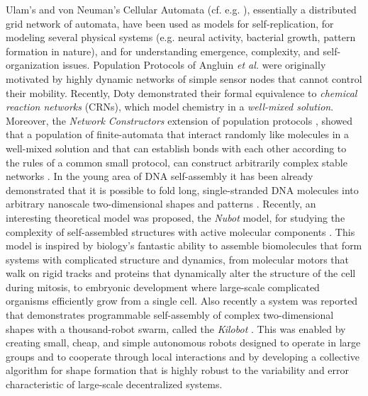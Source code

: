 \documentclass[oribibl, 11pt]{llncs}
\begin{document}
Ulam's and von Neuman's Cellular Automata (cf. e.g. \cite{Sc11}), essentially a distributed grid network of automata, have been used as models for self-replication, for modeling several physical systems (e.g. neural activity, bacterial growth, pattern formation in nature), and for understanding emergence, complexity, and self-organization issues. Population Protocols of Angluin \emph{et al.} \cite{AADFP06} were originally motivated by highly dynamic networks of simple sensor nodes that cannot control their mobility. Recently, Doty \cite{Do14} demonstrated their formal equivalence to \emph{chemical reaction networks} (CRNs), which model chemistry in a \emph{well-mixed solution}. Moreover, the \emph{Network Constructors} extension of population protocols \cite{MS14}, showed that a population of finite-automata that interact randomly like molecules in a well-mixed solution and that can establish bonds with each other according to the rules of a common small protocol, can construct arbitrarily complex stable networks \cite{MS14}. In the young area of DNA self-assembly it has been already demonstrated that it is possible to fold long, single-stranded DNA molecules into arbitrary nanoscale two-dimensional shapes and patterns \cite{Ro06}. Recently, an interesting theoretical model was proposed, the \emph{Nubot} model, for studying the complexity of self-assembled structures with active molecular components \cite{WCG13}. This model is inspired by biology's fantastic ability to assemble biomolecules that form systems with complicated structure and dynamics, from molecular motors that walk on rigid tracks and proteins that dynamically alter the structure of the cell during mitosis, to embryonic development where large-scale complicated organisms efficiently grow from a single cell.  Also recently a system was reported that demonstrates programmable self-assembly of complex two-dimensional shapes with a thousand-robot swarm, called the \emph{Kilobot} \cite{RCN14}. This was enabled by creating small, cheap, and simple autonomous robots designed to operate in large groups and to cooperate through local interactions and by developing a collective algorithm for shape formation that is highly robust to the variability and error characteristic of large-scale decentralized systems.
\end{document}
